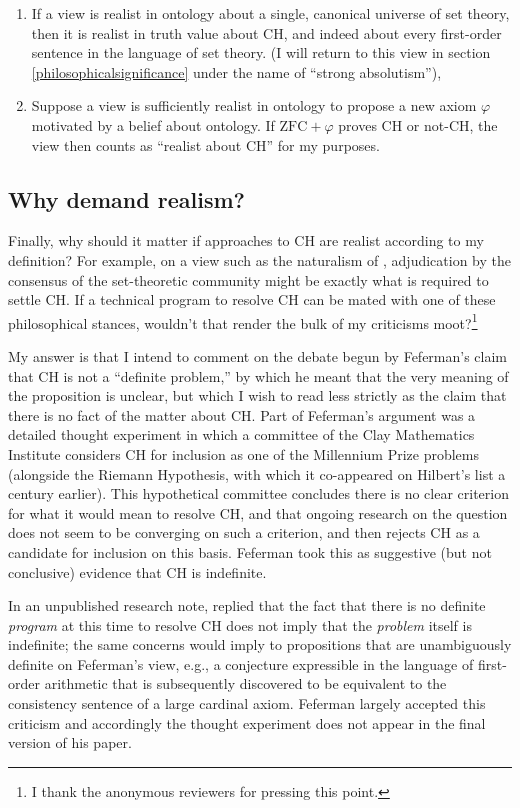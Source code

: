 \documentclass[letterpaper,12pt]{article}
\renewcommand{\phi}{\varphi}
\begin{document}
\begin{enumerate}
\item
If a view is realist in ontology about a single, canonical universe of set theory, then it is realist in truth value about CH, and indeed about every first-order sentence in the language of set theory. (I will return to this view in section \ref{philosophicalsignificance} under the name of ``strong absolutism''),
\item
Suppose a view is sufficiently realist in ontology to propose a new axiom $\phi$ motivated by a belief about ontology. If $\mathrm{ZFC} + \phi$ proves CH or not-CH, the view then counts as ``realist about CH'' for my purposes.
\end{enumerate}

\subsection{Why demand realism?}
Finally, why should it matter if approaches to CH are realist according to my definition? For example, on a view such as the naturalism of \cite{Maddy1997-MADNIM}, adjudication by the consensus of the set-theoretic community might be exactly what is required to settle CH. If a technical program to resolve CH can be mated with one of these philosophical stances, wouldn't that render the bulk of my criticisms moot?\footnote{I thank the anonymous reviewers for pressing this point.}

My answer is that I intend to comment on the debate begun by Feferman's claim \citeyearpar{feferman2011ch} that CH is not a ``definite problem,'' by which he meant that the very meaning of the proposition is unclear, but which I wish to read less strictly as the claim that there is no fact of the matter about CH. Part of Feferman's argument was a detailed thought experiment in which a committee of the Clay Mathematics Institute considers CH for inclusion as one of the Millennium Prize problems (alongside the Riemann Hypothesis, with which it co-appeared on Hilbert's list a century earlier). This hypothetical committee concludes there is no clear criterion for what it would mean to resolve CH, and that ongoing research on the question does not seem to be converging on such a criterion, and then rejects CH as a candidate for inclusion on this basis. Feferman took this as suggestive (but not conclusive) evidence that CH is indefinite.

In an unpublished research note, \cite{koellner2012fefermanreply} replied that the fact that there is no definite \emph{program} at this time to resolve CH does not imply that the \emph{problem} itself is indefinite; the same concerns would imply to propositions that are unambiguously definite on Feferman's view, e.g., a conjecture expressible in the language of first-order arithmetic that is subsequently discovered to be equivalent to the consistency sentence of a large cardinal axiom. Feferman largely accepted this criticism and accordingly the thought experiment does not appear in the final version \citeyearpar{feferman2015chfinal} of his paper.
\end{document}
